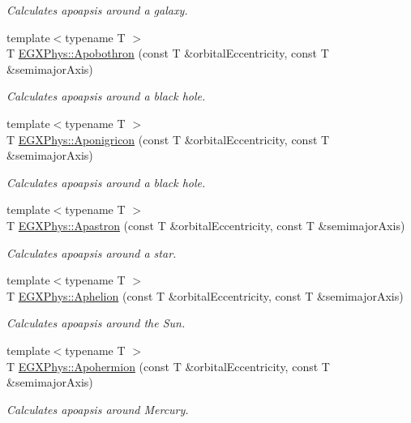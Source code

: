 \begin{DoxyCompactItemize}
\begin{DoxyCompactList}\small\item\em Calculates apoapsis around a galaxy. \end{DoxyCompactList}\item 
{\footnotesize template$<$typename T $>$ }\\T \hyperlink{group___astrophysics_ga6fe084b9e69f47a5032b05aa8f6bf7ad}{E\+G\+X\+Phys\+::\+Apobothron} (const T \&orbital\+Eccentricity, const T \&semimajor\+Axis)
\begin{DoxyCompactList}\small\item\em Calculates apoapsis around a black hole. \end{DoxyCompactList}\item 
{\footnotesize template$<$typename T $>$ }\\T \hyperlink{group___astrophysics_ga83e866e2f887ff8eafbc3971d4cab8be}{E\+G\+X\+Phys\+::\+Aponigricon} (const T \&orbital\+Eccentricity, const T \&semimajor\+Axis)
\begin{DoxyCompactList}\small\item\em Calculates apoapsis around a black hole. \end{DoxyCompactList}\item 
{\footnotesize template$<$typename T $>$ }\\T \hyperlink{group___astrophysics_ga2fc1c406ce10f59b4f325150aecd279a}{E\+G\+X\+Phys\+::\+Apastron} (const T \&orbital\+Eccentricity, const T \&semimajor\+Axis)
\begin{DoxyCompactList}\small\item\em Calculates apoapsis around a star. \end{DoxyCompactList}\item 
{\footnotesize template$<$typename T $>$ }\\T \hyperlink{group___astrophysics_ga77dadb4d082a441c8e85203c983722c7}{E\+G\+X\+Phys\+::\+Aphelion} (const T \&orbital\+Eccentricity, const T \&semimajor\+Axis)
\begin{DoxyCompactList}\small\item\em Calculates apoapsis around the Sun. \end{DoxyCompactList}\item 
{\footnotesize template$<$typename T $>$ }\\T \hyperlink{group___astrophysics_gab002349e578241b3514f2212da9a7d48}{E\+G\+X\+Phys\+::\+Apohermion} (const T \&orbital\+Eccentricity, const T \&semimajor\+Axis)
\begin{DoxyCompactList}\small\item\em Calculates apoapsis around Mercury. \end{DoxyCompactList}\item 

\end{DoxyCompactItemize}
